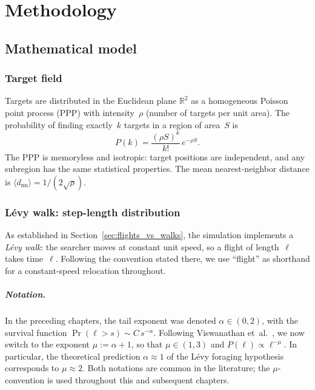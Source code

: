 \chapter{Methodology}
\label{ch:methodology}

\section{Mathematical model}
\label{sec:math_model}

\subsection{Target field}

Targets are distributed in the Euclidean plane $\mathbb{R}^2$ as
a homogeneous Poisson point process (PPP) with intensity~$\rho$
(number of targets per unit area).  The probability of finding
exactly~$k$ targets in a region of area~$S$ is
\begin{equation}
  P(k) = \frac{(\rho S)^k}{k!}\,e^{-\rho S}.
  \label{eq:poisson}
\end{equation}
The PPP is memoryless and isotropic: target positions are
independent, and any subregion has the same statistical
properties.  The mean nearest-neighbor distance is
$\langle d_{\mathrm{nn}} \rangle = 1/(2\sqrt{\rho})$.

\subsection{L\'evy walk: step-length distribution}

As established in Section~\ref{sec:flights_vs_walks}, the simulation
implements a \emph{L\'evy walk}: the searcher moves at constant unit
speed, so a flight of length~$\ell$ takes time~$\ell$.
Following the convention stated there, we use ``flight'' as shorthand
for a constant-speed relocation throughout.

\paragraph{Notation.}
In the preceding chapters, the tail exponent was denoted $\alpha\in(0,2)$,
with the survival function $\Pr(\ell > s)\sim C\,s^{-\alpha}$.
Following Viswanathan et~al.~\cite{viswanathan1999optimizing}, we now switch
to the exponent $\mu:=\alpha+1$, so that $\mu\in(1,3)$ and
$P(\ell)\propto\ell^{-\mu}$.  In particular, the theoretical prediction
$\alpha\approx 1$ of the L\'evy foraging hypothesis corresponds to
$\mu\approx 2$.  Both notations are common in the literature; the
$\mu$-convention is used throughout this and subsequent chapters.

